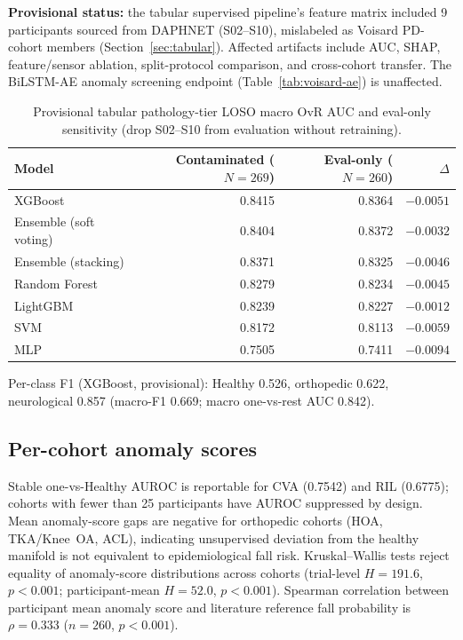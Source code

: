 \documentclass[11pt,a4paper]{article}
\begin{document}
\textbf{Provisional status:} the tabular supervised pipeline's feature matrix included 9 participants sourced from DAPHNET (S02--S10), mislabeled as Voisard PD-cohort members (Section~\ref{sec:tabular}). Affected artifacts include AUC, SHAP, feature/sensor ablation, split-protocol comparison, and cross-cohort transfer. The BiLSTM-AE anomaly screening endpoint (Table~\ref{tab:voisard-ae}) is unaffected.

\begin{table}[ht]
\centering
\caption{Provisional tabular pathology-tier LOSO macro OvR AUC and eval-only sensitivity (drop S02--S10 from evaluation without retraining).}
\label{tab:tabular}
\begin{tabular}{lrrr}
\toprule
Model & Contaminated ($N{=}269$) & Eval-only ($N{=}260$) & $\Delta$ \\
\midrule
XGBoost & 0.8415 & 0.8364 & $-0.0051$ \\
Ensemble (soft voting) & 0.8404 & 0.8372 & $-0.0032$ \\
Ensemble (stacking) & 0.8371 & 0.8325 & $-0.0046$ \\
Random Forest & 0.8279 & 0.8234 & $-0.0045$ \\
LightGBM & 0.8239 & 0.8227 & $-0.0012$ \\
SVM & 0.8172 & 0.8113 & $-0.0059$ \\
MLP & 0.7505 & 0.7411 & $-0.0094$ \\
\bottomrule
\end{tabular}
\end{table}

Per-class F1 (XGBoost, provisional): Healthy 0.526, orthopedic 0.622, neurological 0.857 (macro-F1 0.669; macro one-vs-rest AUC 0.842).

\subsection{Per-cohort anomaly scores}

Stable one-vs-Healthy AUROC is reportable for CVA (0.7542) and RIL (0.6775); cohorts with fewer than 25 participants have AUROC suppressed by design. Mean anomaly-score gaps are negative for orthopedic cohorts (HOA, TKA/Knee~OA, ACL), indicating unsupervised deviation from the healthy manifold is not equivalent to epidemiological fall risk. Kruskal--Wallis tests reject equality of anomaly-score distributions across cohorts (trial-level $H=191.6$, $p<0.001$; participant-mean $H=52.0$, $p<0.001$). Spearman correlation between participant mean anomaly score and literature reference fall probability is $\rho=0.333$ ($n=260$, $p<0.001$).
\end{document}
